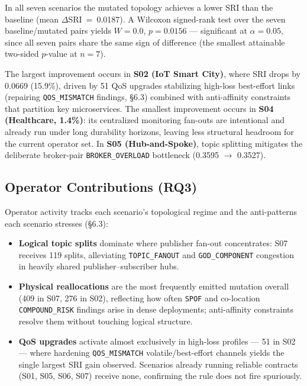 \documentclass[11pt]{article}
\begin{document}
In all seven scenarios the mutated topology achieves a lower SRI than the baseline (mean
$\Delta$SRI~=~0.0187). A Wilcoxon signed-rank test over the seven baseline/mutated pairs yields $W =
0.0$, $p = 0.0156$ --- significant at $\alpha = 0.05$, since all seven pairs share the same sign of
difference (the smallest attainable two-sided $p$-value at $n=7$).

The largest improvement occurs in \textbf{S02 (IoT Smart City)}, where SRI drops by 0.0669 (15.9\%),
driven by 51 QoS upgrades stabilizing high-loss best-effort links (repairing \texttt{QOS\_MISMATCH}
findings, \S6.3) combined with anti-affinity constraints that partition key microservices. The
smallest improvement occurs in \textbf{S04 (Healthcare, 1.4\%)}: its centralized monitoring fan-outs
are intentional and already run under long durability horizons, leaving less structural headroom for
the current operator set. In \textbf{S05 (Hub-and-Spoke)}, topic splitting mitigates the deliberate
broker-pair \texttt{BROKER\_OVERLOAD} bottleneck (0.3595 $\to$ 0.3527).

\subsection{Operator Contributions (RQ3)}

Operator activity tracks each scenario's topological regime and the anti-patterns each scenario
stresses (\S6.3):

\begin{itemize}
\item \textbf{Logical topic splits} dominate where publisher fan-out concentrates: S07 receives 119
  splits, alleviating \texttt{TOPIC\_FANOUT} and \texttt{GOD\_COMPONENT} congestion in heavily shared
  publisher--subscriber hubs.
\item \textbf{Physical reallocations} are the most frequently emitted mutation overall (409 in S07,
  276 in S02), reflecting how often \texttt{SPOF} and co-location \texttt{COMPOUND\_RISK} findings
  arise in dense deployments; anti-affinity constraints resolve them without touching logical
  structure.
\item \textbf{QoS upgrades} activate almost exclusively in high-loss profiles --- 51 in S02 --- where
  hardening \texttt{QOS\_MISMATCH} volatile/best-effort channels yields the single largest SRI gain
  observed. Scenarios already running reliable contracts (S01, S05, S06, S07) receive none,
  confirming the rule does not fire spuriously.
\end{itemize}
\end{document}
